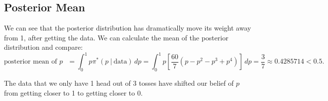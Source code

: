 \documentclass{article}
\begin{document}
\subsection*{Posterior Mean}

We can see that the posterior distribution has dramatically move its weight away from 1, after getting the data. We can calculate the mean of the posterior distribution and compare:
$$ \text{posterior mean of $p$ }=\int_0^1 p\pi^*(p~|~\text{data})\, dp = \int_0^1 p\left[\frac{60}{7}(p-p^2-p^3+p^4)\right]\, dp = \frac{3}{7} \approx 0.4285714 < 0.5.$$ 

The data that we only have 1 head out of 3 tosses have shifted our belief of $p$ from getting closer to 1 to getting closer to 0.
\end{document}
